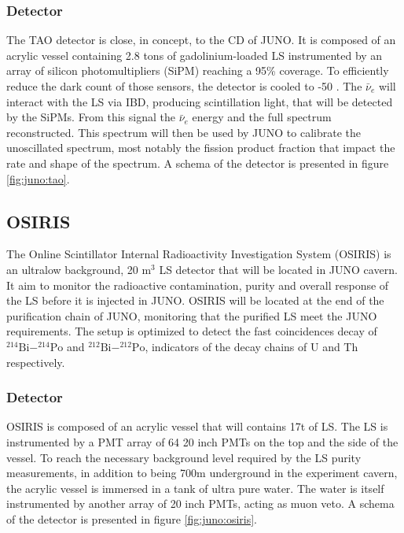 \documentclass[../main.tex]{subfiles}
\begin{document}
\subsubsection{Detector}

The TAO detector is close, in concept, to the CD of JUNO. It is composed of an acrylic vessel containing 2.8 tons of gadolinium-loaded LS instrumented by an array of silicon photomultipliers (SiPM) reaching a 95\% coverage. To efficiently reduce the dark count of those sensors, the detector is cooled to -50 \textcelsius.
The $\bar{\nu}_e$ will interact with the LS via IBD, producing scintillation light, that will be detected by the SiPMs. From this signal the $\bar{\nu}_e$ energy and the full spectrum reconstructed.
This spectrum will then be used by JUNO to calibrate the unoscillated spectrum, most notably the fission product fraction that impact the rate and shape of the spectrum. A schema of the detector is presented in figure \ref{fig:juno:tao}.

\subsection{OSIRIS}
\label{sec:juno:OSIRIS}
The Online Scintillator Internal Radioactivity Investigation System (OSIRIS) \cite{juno_collaboration_design_2021} is an ultralow background, 20 m$^3$ LS detector that will be located in JUNO cavern. It aim to monitor the radioactive contamination, purity and overall response of the LS before it is injected in JUNO.
OSIRIS will be located at the end of the purification chain of JUNO, monitoring that the purified LS meet the JUNO requirements. The setup is optimized to detect the fast coincidences decay of $^{214}\mathrm{Bi}-^{214}\mathrm{Po}$ and $^{212}\mathrm{Bi}-^{212}\mathrm{Po}$, indicators of the decay chains of U and Th respectively.
\subsubsection{Detector}
OSIRIS is composed of an acrylic vessel that will contains 17t of LS. The LS is instrumented by a PMT array of 64 20 inch PMTs on the top and the side of the vessel. To reach the necessary background level required by the LS purity measurements, in addition to being 700m underground in the experiment cavern, the acrylic vessel is immersed in a tank of ultra pure water. The water is itself instrumented by another array of 20 inch PMTs, acting as muon veto. A schema of the detector is presented in figure \ref{fig:juno:osiris}.
\end{document}

